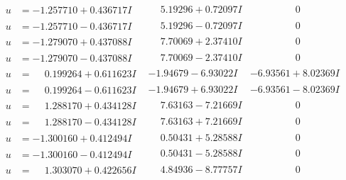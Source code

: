 \documentclass[1p]{elsarticle_modified}
\theoremstyle{definition}
\begin{document}
$$\begin{array}{c|c|c}
\begin{aligned}
u &= -1.257710 + 0.436717 I\end{aligned}
 & \phantom{-}5.19296 + 0.72097 I & \phantom{-0.000000 } 0 \\ \hline\begin{aligned}
u &= -1.257710 - 0.436717 I\end{aligned}
 & \phantom{-}5.19296 - 0.72097 I & \phantom{-0.000000 } 0 \\ \hline\begin{aligned}
u &= -1.279070 + 0.437088 I\end{aligned}
 & \phantom{-}7.70069 + 2.37410 I & \phantom{-0.000000 } 0 \\ \hline\begin{aligned}
u &= -1.279070 - 0.437088 I\end{aligned}
 & \phantom{-}7.70069 - 2.37410 I & \phantom{-0.000000 } 0 \\ \hline\begin{aligned}
u &= \phantom{-}0.199264 + 0.611623 I\end{aligned}
 & -1.94679 - 6.93022 I & -6.93561 + 8.02369 I \\ \hline\begin{aligned}
u &= \phantom{-}0.199264 - 0.611623 I\end{aligned}
 & -1.94679 + 6.93022 I & -6.93561 - 8.02369 I \\ \hline\begin{aligned}
u &= \phantom{-}1.288170 + 0.434128 I\end{aligned}
 & \phantom{-}7.63163 - 7.21669 I & \phantom{-0.000000 } 0 \\ \hline\begin{aligned}
u &= \phantom{-}1.288170 - 0.434128 I\end{aligned}
 & \phantom{-}7.63163 + 7.21669 I & \phantom{-0.000000 } 0 \\ \hline\begin{aligned}
u &= -1.300160 + 0.412494 I\end{aligned}
 & \phantom{-}0.50431 + 5.28588 I & \phantom{-0.000000 } 0 \\ \hline\begin{aligned}
u &= -1.300160 - 0.412494 I\end{aligned}
 & \phantom{-}0.50431 - 5.28588 I & \phantom{-0.000000 } 0 \\ \hline\begin{aligned}
u &= \phantom{-}1.303070 + 0.422656 I\end{aligned}
 & \phantom{-}4.84936 - 8.77757 I & \phantom{-0.000000 } 0 \\ \hline\begin{aligned}

\end{aligned}
\end{array}$$
\end{document}
